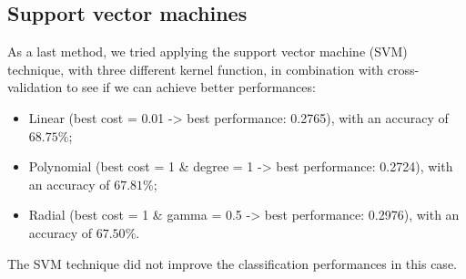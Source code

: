 \subsection{Support vector machines}

As a last method, we tried applying the support vector machine (SVM) technique, with three different kernel function, in combination with cross-validation to see if we can achieve better performances:
\begin{itemize}
	\item Linear (best cost = 0.01 -> best performance: 0.2765), with an accuracy of $68.75\%$;
	\item Polynomial (best cost = 1 \& degree = 1 -> best performance: 0.2724), with an accuracy of $67.81\%$;
	\item Radial (best cost = 1 \& gamma = 0.5 -> best performance: 0.2976), with an accuracy of $67.50\%$.
\end{itemize} 

The SVM technique did not improve the classification performances in this case.